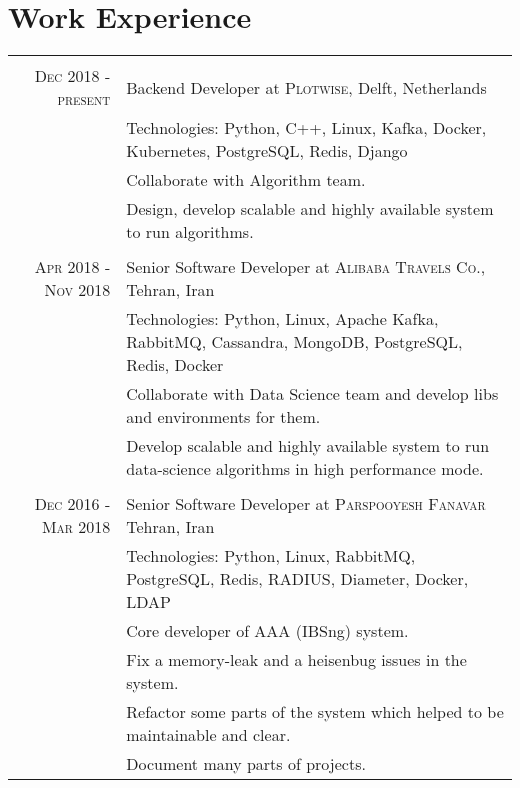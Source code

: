 \documentclass[a4paper,11pt]{article}
\begin{document}
\section{Work Experience}
\begin{tabular}{r|p{11cm}}

    \multicolumn{2}{c}{}\\
    \textsc{Dec 2018 - present}
    & Backend Developer at \textsc{Plotwise},
    Delft, Netherlands\\
    &\footnotesize{Technologies: Python, C++, Linux, Kafka, Docker, Kubernetes, PostgreSQL, Redis, Django}\\
    &\footnotesize{Collaborate with Algorithm team.}\\
    &\footnotesize{Design, develop scalable and highly available system to run algorithms.}\\

    \multicolumn{2}{c}{}\\
    \textsc{Apr 2018 - Nov 2018}
    & Senior Software Developer at \textsc{Alibaba Travels Co.},
    Tehran, Iran\\
    &\footnotesize{Technologies: Python, Linux, Apache Kafka, RabbitMQ, Cassandra, MongoDB, PostgreSQL, Redis, Docker}\\
    &\footnotesize{Collaborate with Data Science team and develop libs and environments for them.}\\
    &\footnotesize{Develop scalable and highly available system to run data-science algorithms in high performance mode.}\\

    \multicolumn{2}{c}{}\\
    \textsc{Dec 2016 - Mar 2018}
    & Senior Software Developer at \textsc{Parspooyesh Fanavar}
    Tehran, Iran\\
    &\footnotesize{Technologies: Python, Linux, RabbitMQ, PostgreSQL, Redis, RADIUS, Diameter, Docker, LDAP}\\
    &\footnotesize{Core developer of AAA (IBSng) system.}\\
    &\footnotesize{Fix a memory-leak and a heisenbug issues in the system.}\\
    &\footnotesize{Refactor some parts of the system which helped to be maintainable and clear.}\\
    &\footnotesize{Document many parts of projects.}\\

\end{tabular}
\end{document}
